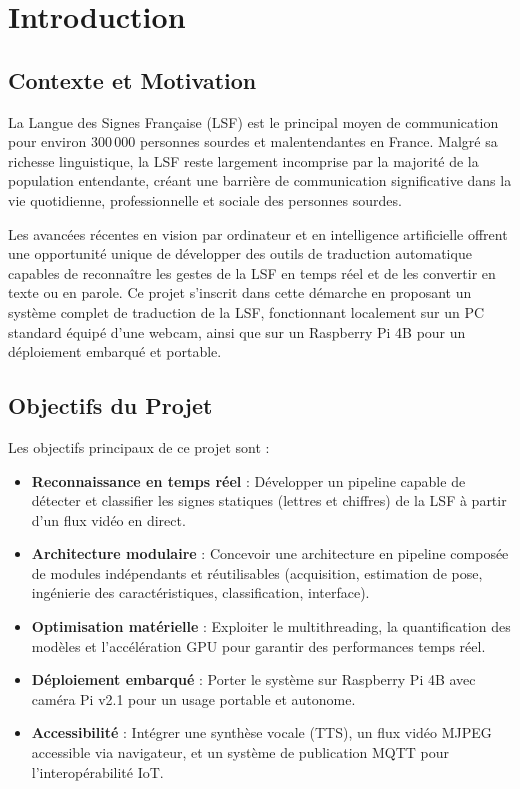 \chapter{Introduction}

\section{Contexte et Motivation}

La Langue des Signes Française (LSF) est le principal moyen de communication pour environ 300\,000 personnes sourdes et malentendantes en France. Malgré sa richesse linguistique, la LSF reste largement incomprise par la majorité de la population entendante, créant une barrière de communication significative dans la vie quotidienne, professionnelle et sociale des personnes sourdes.

Les avancées récentes en vision par ordinateur et en intelligence artificielle offrent une opportunité unique de développer des outils de traduction automatique capables de reconnaître les gestes de la LSF en temps réel et de les convertir en texte ou en parole. Ce projet s'inscrit dans cette démarche en proposant un système complet de traduction de la LSF, fonctionnant localement sur un PC standard équipé d'une webcam, ainsi que sur un Raspberry Pi 4B pour un déploiement embarqué et portable.

\section{Objectifs du Projet}

Les objectifs principaux de ce projet sont :

\begin{itemize}
    \item \textbf{Reconnaissance en temps réel} : Développer un pipeline capable de détecter et classifier les signes statiques (lettres et chiffres) de la LSF à partir d'un flux vidéo en direct.
    \item \textbf{Architecture modulaire} : Concevoir une architecture en pipeline composée de modules indépendants et réutilisables (acquisition, estimation de pose, ingénierie des caractéristiques, classification, interface).
    \item \textbf{Optimisation matérielle} : Exploiter le multithreading, la quantification des modèles et l'accélération GPU pour garantir des performances temps réel.
    \item \textbf{Déploiement embarqué} : Porter le système sur Raspberry Pi 4B avec caméra Pi v2.1 pour un usage portable et autonome.
    \item \textbf{Accessibilité} : Intégrer une synthèse vocale (TTS), un flux vidéo MJPEG accessible via navigateur, et un système de publication MQTT pour l'interopérabilité IoT.
\end{itemize}

